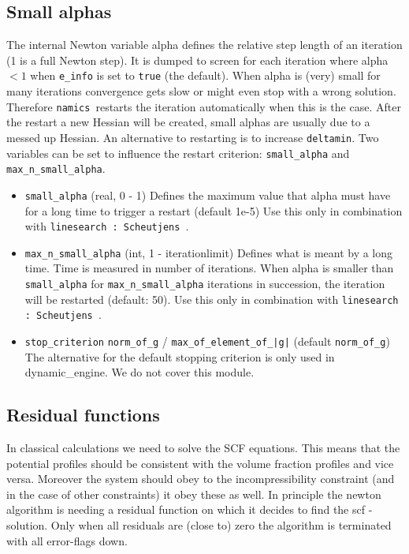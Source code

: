 \documentclass{article}
\newcommand{\namics}{{\tt namics}}
\begin{document}
\subsection{Small alphas}
\label{sec:smallalpha}
The internal Newton variable alpha defines the relative step length of an iteration (1 is a full Newton step).  It is dumped to screen for each iteration where alpha $< 1$ when {\tt e\_info} is set to {\tt true} (the default).  When alpha is (very) small for many iterations convergence gets slow or might even stop with a wrong solution. Therefore \namics\ restarts the iteration automatically when this is the case.  After the restart a new Hessian will be created, small alphas are usually due to a messed up Hessian.  An alternative to restarting is to increase {\tt deltamin}.  Two variables can be set to influence the restart criterion: {\tt small\_alpha} and {\tt max\_n\_small\_alpha}. 
\begin{itemize}

\item{\tt small\_alpha} (real, 0 - 1) Defines the maximum value that alpha must have for a long time to trigger a restart (default 1e-5) Use this only in combination with {\tt linesearch : Scheutjens }.

\item {\tt max\_n\_small\_alpha} (int, 1 - iterationlimit) Defines what is meant by a long time.  Time is measured in number of iterations.  When alpha is smaller than {\tt small\_alpha} for {\tt max\_n\_small\_alpha} iterations in succession, the iteration will be restarted (default: 50). Use this only in combination with {\tt linesearch : Scheutjens }.
 

\item {\tt stop\_criterion} {\tt norm\_of\_g} / {\tt max\_of\_element\_of\_|g|} (default {\tt norm\_of\_g}) The alternative for the default stopping criterion is only used in dynamic_engine. We do not cover this module. 
\end{itemize}

\subsection{Residual functions}
In classical calculations we need to solve the SCF equations. This means that the potential profiles should be consistent with the volume fraction profiles and vice versa. Moreover the system should obey to the incompressibility constraint (and in the case of other constraints) it obey these as well. In principle the newton algorithm is needing a residual function on which it decides to find the scf - solution. Only when all residuals are (close to) zero the algorithm is terminated with all error-flags down. 
\end{document}
